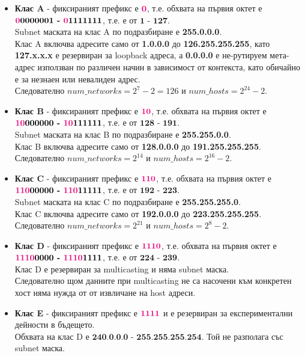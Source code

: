 \documentclass[fleqn,12pt]{article}
\begin{document}
\begin{itemize}
    \item \textbf{Клас A} - фиксираният префикс е $\textbf{\textcolor{RubineRed}{0}}$, т.е. обхвата на първия октет е $\textbf{\textcolor{RubineRed}{0}0000001 - \textcolor{RubineRed}{0}1111111}$, т.е. е от $\textbf{1 - 127}$. \\
    Subnet маската на клас A по подразбиране е \textbf{255.0.0.0}.\\
    Клас A включва адресите само от \textbf{1.0.0.0} до \textbf{126.255.255.255}, като \textbf{127.x.x.x} е резервиран за loopback адреса, а \textbf{0.0.0.0} е не-рутируем мета-адрес използван по различен начин в зависимост от контекста, като обичайно е за незнаен или невалиден адрес.\\
    Следователно $num\_networks = 2^7 - 2 = 126$ и $num\_hosts = 2^{24} - 2$.
    \item \textbf{Клас B} - фиксираният префикс е $\textbf{\textcolor{RubineRed}{10}}$, т.е. обхвата на първия октет е $\textbf{\textcolor{RubineRed}{10}000000 - \textcolor{RubineRed}{10}111111}$, т.е. е от $\textbf{128 - 191}$. \\
    Subnet маската на клас B по подразбиране е \textbf{255.255.0.0}.\\
    Клас B включва адресите само от \textbf{128.0.0.0} до \textbf{191.255.255.255}.\\
    Следователно $num\_networks = 2^{14}$ и $num\_hosts = 2^{16} - 2$.
    \item \textbf{Клас C} - фиксираният префикс е $\textbf{\textcolor{RubineRed}{110}}$, т.е. обхвата на първия октет е $\textbf{\textcolor{RubineRed}{110}00000 - \textcolor{RubineRed}{110}11111}$, т.е. е от $\textbf{192 - 223}$. \\
    Subnet маската на клас C по подразбиране е \textbf{255.255.255.0}.\\
    Клас C включва адресите само от \textbf{192.0.0.0} до \textbf{223.255.255.255}.\\
    Следователно $num\_networks = 2^{21}$ и $num\_hosts = 2^{8} - 2$.
    \item \textbf{Клас D} - фиксираният префикс е $\textbf{\textcolor{RubineRed}{1110}}$, т.е. обхвата на първия октет е $\textbf{\textcolor{RubineRed}{1110}0000 - \textcolor{RubineRed}{1110}1111}$, т.е. е от $\textbf{224 - 239}$. \\
    Клас D е резервиран за multicasting и няма subnet маска. \\
    Следователно щом данните при multicasting не са насочени към конкретен хост няма нужда от от извличане на host адреси.
    \item \textbf{Клас E} - фиксираният префикс е $\textbf{\textcolor{RubineRed}{1111}}$ и е резервиран за експериментални дейности в бъдещето. \\
    Обхвата на клас D е $\textbf{240.0.0.0 - 255.255.255.254}$. Той не разполага със subnet маска.
\end{itemize}
\end{document}
